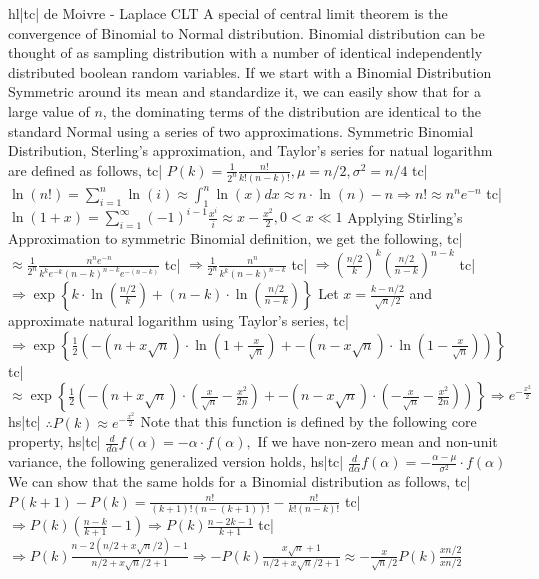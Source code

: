 hl|tc| de Moivre - Laplace CLT
A special of central limit theorem is the convergence of Binomial to Normal distribution. Binomial distribution can be thought of as sampling distribution with a number of identical independently distributed boolean random variables.
If we start with a Binomial Distribution Symmetric around its mean and standardize it, we can easily show that for a large value of \(n\), the dominating terms of the distribution are identical to the standard Normal using a series of two approximations.
Symmetric Binomial Distribution, Sterling's approximation, and Taylor's series for natual logarithm are defined as follows,
tc| \( P(k) = \frac{1}{2^n} \frac{n!}{k!(n-k)!}, \mu = n/2, \sigma^2 = n/4 \)
tc| \( \ln(n!) = \sum_{i=1}^{n} \ln(i) \approx \int^n_1 \ln(x) dx \approx n \cdot \ln(n) - n \Rightarrow n! \approx n^n e^{-n} \)
tc| \( \ln(1+x) = \sum_{i=1}^{\infty} {(-1)}^{i-1}\frac{x^i}{i} \approx x - \frac{x^2}{2}, 0 \lt x \ll 1 \)
Applying Stirling's Approximation to symmetric Binomial definition, we get the following,
tc| \( \approx \frac{1}{2^n} \frac{n^n e^{-n}}{k^k e^{-k} (n-k)^{n-k} e^{-(n-k)}} \)
tc| \( \Rightarrow \frac{1}{2^n} \frac{n^n}{k^k(n-k)^{n-k}} \)
tc| \( \Rightarrow \left(\frac{n/2}{k}\right)^k \left(\frac{n/2}{n-k}\right)^{n-k} \)
tc| \( \Rightarrow \exp\left\{ k \cdot \ln\left(\frac{n/2}{k}\right) + (n-k) \cdot \ln\left(\frac{n/2}{n-k}\right) \right\} \)
Let \(x = \frac{k - n/2}{\sqrt{n}/2}\) and approximate natural logarithm using Taylor's series,
tc| \( \Rightarrow \exp\left\{\frac{1}{2}\left(-(n + x\sqrt{n}) \cdot \ln\left(1+\frac{x}{\sqrt{n}}\right) + -(n - x\sqrt{n}) \cdot \ln\left(1-\frac{x}{\sqrt{n}}\right) \right)\right\} \)
tc| \( \approx \exp\left\{\frac{1}{2}\left(-(n + x\sqrt{n}) \cdot \left(\frac{x}{\sqrt{n}} - \frac{x^2}{2n}\right) + -(n - x\sqrt{n}) \cdot \left(-\frac{x}{\sqrt{n}} - \frac{x^2}{2n}\right) \right)\right\} \Rightarrow e^{-\frac{x^2}{2}} \)
hs|tc| \( \therefore P(k) \approx e^{-\frac{x^2}{2}} \)
Note that this function is defined by the following core property,
hs|tc| \( \frac{d}{d\alpha}f(\alpha)= -\alpha \cdot f(\alpha), \)
If we have non-zero mean and non-unit variance, the following generalized version holds,
hs|tc| \( \frac{d}{d\alpha}f(\alpha)= -\frac{\alpha-\mu}{\sigma^2} \cdot f(\alpha) \)
We can show that the same holds for a Binomial distribution as follows,
tc| \( P(k+1) - P(k) = \frac{n!}{(k+1)!(n-(k+1))!} - \frac{n!}{k!(n-k)!} \)
tc| \( \Rightarrow P(k)\left(\frac{n-k}{k+1} - 1\right) \Rightarrow P(k)\frac{n-2k-1}{k+1} \)
tc| \( \Rightarrow P(k)\frac{n-2(n/2 + x\sqrt{n}/2)-1}{n/2 + x\sqrt{n}/2 +1} \Rightarrow -P(k)\frac{x\sqrt{n} + 1}{n/2 + x\sqrt{n}/2 + 1} \approx -\frac{x}{\sqrt{n}/2}P(k)\frac{xn/2}{xn/2} \)
